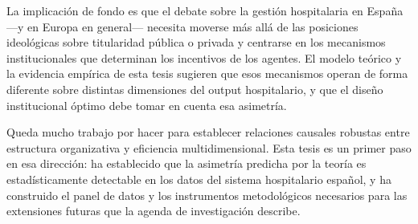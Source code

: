 La implicación de fondo es que el debate sobre la gestión hospitalaria en España ---y en Europa en general--- necesita moverse más allá de las posiciones ideológicas sobre titularidad pública o privada y centrarse en los mecanismos institucionales que determinan los incentivos de los agentes. El modelo teórico y la evidencia empírica de esta tesis sugieren que esos mecanismos operan de forma diferente sobre distintas dimensiones del output hospitalario, y que el diseño institucional óptimo debe tomar en cuenta esa asimetría.

Queda mucho trabajo por hacer para establecer relaciones causales robustas entre estructura organizativa y eficiencia multidimensional. Esta tesis es un primer paso en esa dirección: ha establecido que la asimetría predicha por la teoría es estadísticamente detectable en los datos del sistema hospitalario español, y ha construido el panel de datos y los instrumentos metodológicos necesarios para las extensiones futuras que la agenda de investigación describe.



